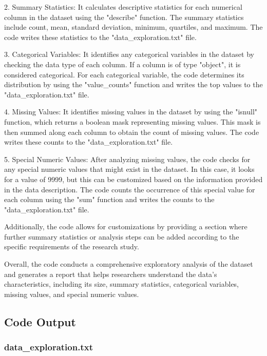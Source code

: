 \documentclass[11pt]{article}
\begin{document}
2. Summary Statistics: It calculates descriptive statistics for each numerical column in the dataset using the "describe" function. The summary statistics include count, mean, standard deviation, minimum, quartiles, and maximum. The code writes these statistics to the "data\_exploration.txt" file.

3. Categorical Variables: It identifies any categorical variables in the dataset by checking the data type of each column. If a column is of type "object", it is considered categorical. For each categorical variable, the code determines its distribution by using the "value\_counts" function and writes the top values to the "data\_exploration.txt" file.

4. Missing Values: It identifies missing values in the dataset by using the "isnull" function, which returns a boolean mask representing missing values. This mask is then summed along each column to obtain the count of missing values. The code writes these counts to the "data\_exploration.txt" file.

5. Special Numeric Values: After analyzing missing values, the code checks for any special numeric values that might exist in the dataset. In this case, it looks for a value of 9999, but this can be customized based on the information provided in the data description. The code counts the occurrence of this special value for each column using the "sum" function and writes the counts to the "data\_exploration.txt" file.

Additionally, the code allows for customizations by providing a section where further summary statistics or analysis steps can be added according to the specific requirements of the research study.

Overall, the code conducts a comprehensive exploratory analysis of the dataset and generates a report that helps researchers understand the data's characteristics, including its size, summary statistics, categorical variables, missing values, and special numeric values.

\subsection{Code Output}

\subsubsection*{data\_exploration.txt}
\end{document}
